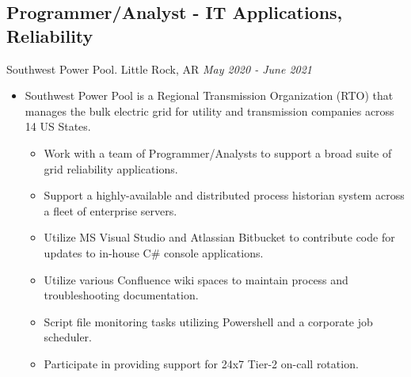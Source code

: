\documentclass[11pt]{article}
\begin{document}
\subsection*{Programmer/Analyst - IT Applications, Reliability}
Southwest Power Pool. Little Rock, AR \hfill \textit{May 2020 - June 2021} \\
\begin{itemize}
	\item Southwest Power Pool is a Regional Transmission Organization (RTO) that manages the bulk electric grid for utility and transmission companies across 14 US States.
 \begin{itemize}
  \item Work with a team of Programmer/Analysts to support a broad suite of grid reliability applications.
  \item Support a highly-available and distributed process historian system across a fleet of enterprise servers.
  \item Utilize MS Visual Studio and Atlassian Bitbucket to contribute code for updates to in-house C\# console applications.
  \item Utilize various Confluence wiki spaces to maintain process and troubleshooting documentation.
  \item Script file monitoring tasks utilizing Powershell and a corporate job scheduler.
  \item Participate in providing support for 24x7 Tier-2 on-call rotation.
 \end{itemize}
\end{itemize}
\\
\end{document}
